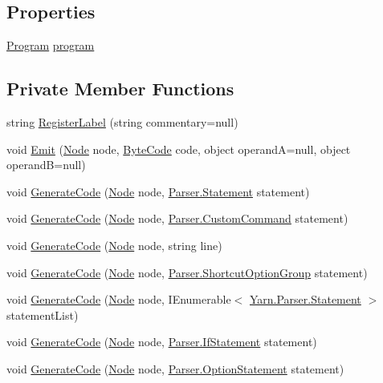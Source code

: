 \subsection*{Properties}
\begin{DoxyCompactItemize}
\item 
\hyperlink{a00067}{Program} \hyperlink{a00029_aa1737da428ec7d597009661dd8a47829}{program}
\end{DoxyCompactItemize}
\subsection*{Private Member Functions}
\begin{DoxyCompactItemize}
\item 
string \hyperlink{a00029_a1bae0d8b701a59708641aa36ea971fa5}{Register\-Label} (string commentary=null)
\item 
void \hyperlink{a00029_a774e8c143cdda0584fcfdda98626a83c}{Emit} (\hyperlink{a00026_a00160}{Node} node, \hyperlink{a00026_ad5dfb6ee68ca7469623ad3e459f98894}{Byte\-Code} code, object operand\-A=null, object operand\-B=null)
\item 
void \hyperlink{a00029_a006f3becd521cc179ba3d3352f6f930b}{Generate\-Code} (\hyperlink{a00026_a00160}{Node} node, \hyperlink{a00076}{Parser.\-Statement} statement)
\item 
void \hyperlink{a00029_a656b6c7fcd08d24300ec592465274f66}{Generate\-Code} (\hyperlink{a00026_a00160}{Node} node, \hyperlink{a00032}{Parser.\-Custom\-Command} statement)
\item 
void \hyperlink{a00029_a860767f3594afeae1c5fe21b7b82cbc6}{Generate\-Code} (\hyperlink{a00026_a00160}{Node} node, string line)
\item 
void \hyperlink{a00029_a3e492edcefdfeacec80e528f8c4fa6cc}{Generate\-Code} (\hyperlink{a00026_a00160}{Node} node, \hyperlink{a00071}{Parser.\-Shortcut\-Option\-Group} statement)
\item 
void \hyperlink{a00029_ab4f6dd2ddf38b0c5bfb2b8a40869a09a}{Generate\-Code} (\hyperlink{a00026_a00160}{Node} node, I\-Enumerable$<$ \hyperlink{a00076}{Yarn.\-Parser.\-Statement} $>$ statement\-List)
\item 
void \hyperlink{a00029_a6ab14514a3b0644ae39c626e5e5e180d}{Generate\-Code} (\hyperlink{a00026_a00160}{Node} node, \hyperlink{a00043}{Parser.\-If\-Statement} statement)
\item 
void \hyperlink{a00029_a5cb3cbcd9727bdef018ec5299bd13142}{Generate\-Code} (\hyperlink{a00026_a00160}{Node} node, \hyperlink{a00061}{Parser.\-Option\-Statement} statement)

\end{DoxyCompactItemize}
